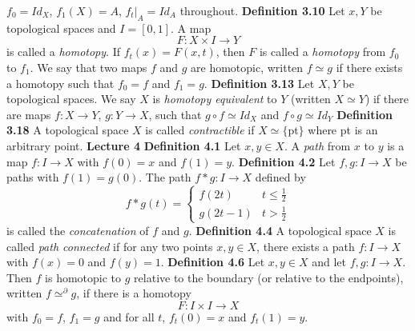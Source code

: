 \newline \newline $ f_0 = Id_X$, $f_1(X) = A$, $f_{t}|_A = Id_A$ throughout.
\newline \newline \textbf{Definition 3.10} Let $x, Y$ be topological spaces and $I = [0,1]$. A map $$F:X \times I \rightarrow Y$$ is called a \textit{homotopy}. If $f_t(x) = F(x,t)$, then $F$ is called a \textit{homotopy} from $f_0$ to $f_1$. We say that two maps $f$ and $g$ are homotopic, written $f \simeq g$ if there exists a homotopy such that $f_0 = f$ and $f_1 = g$.
\newline \newline \textbf{Definition 3.13} Let $X, Y$ be topological spaces. We say $X$ is \textit{homotopy equivalent} to $Y$ (written $X \simeq Y$) if there are maps \newline \newline $f: X \rightarrow Y$, $g: Y \rightarrow X$, \newline \newline such that $g \circ f \simeq Id_X$ and $f \circ g \simeq Id_Y$
\newline \newline \textbf{Definition 3.18} A topological space $X$ is called \textit{contractible} if $X \simeq \{$pt$\}$ where pt is an arbitrary point.
\newline \newline \textbf{Lecture 4}
\newline \newline \textbf{Definition 4.1} Let $x,y \in X$. A \textit{path} from $x$ to $y$ is a map $f: I \rightarrow X$ with $f(0) = x$ and $f(1) = y$.
\newline \newline \textbf{Definition 4.2} Let $f,g:I \rightarrow X$ be paths with $f(1) = g(0)$. The path $f \ast g: I \rightarrow X$ defined by $$f \ast g(t) = \begin{cases} 
          f(2t) & t\leq \frac{1}{2} \\
          g(2t-1) & t > \frac{1}{2}
       \end{cases} $$ 
is called the \textit{concatenation} of $f$ and $g$.
\newline \newline \textbf{Definition 4.4} A topological space $X$ is called \textit{path connected} if for any two points $x, y \in X$, there exists a path $f: I \rightarrow X$ with $f(x) = 0$ and $f(y) = 1$.
\newline \newline \textbf{Definition 4.6} Let $x,y \in X$ and let $f,g: I \rightarrow X$. Then $f$ is homotopic to $g$ relative to the boundary (or relative to the endpoints), written $f \simeq^{\partial} g$, if there is a homotopy $$F: I \times I \rightarrow X$$ with $f_0 = f$, $f_1 = g$ and for all $t$, $f_t(0) = x$ and $f_t(1) = y$.
